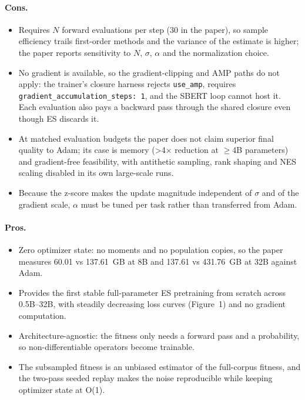\paragraph{Cons.}
\begin{itemize}[leftmargin=*]
\item Requires $N$ forward evaluations per step (30 in the paper), so sample efficiency trails first-order methods and the variance of the estimate is higher; the paper reports sensitivity to $N$, $\sigma$, $\alpha$ and the normalization choice.
\item No gradient is available, so the gradient-clipping and AMP paths do not apply: the trainer's closure harness rejects \texttt{use\_amp}, requires \texttt{gradient\_accumulation\_steps: 1}, and the SBERT loop cannot host it. Each evaluation also pays a backward pass through the shared closure even though ES discards it.
\item At matched evaluation budgets the paper does not claim superior final quality to Adam; its case is memory (>4$\times$ reduction at $\ge$4B parameters) and gradient-free feasibility, with antithetic sampling, rank shaping and NES scaling disabled in its own large-scale runs.
\item Because the z-score makes the update magnitude independent of $\sigma$ and of the gradient scale, $\alpha$ must be tuned per task rather than transferred from Adam.
\end{itemize}

\paragraph{Pros.}
\begin{itemize}[leftmargin=*]
\item Zero optimizer state: no moments and no population copies, so the paper measures 60.01 vs 137.61~GB at 8B and 137.61 vs 431.76~GB at 32B against Adam.
\item Provides the first stable full-parameter ES pretraining from scratch across 0.5B--32B, with steadily decreasing loss curves (Figure~1) and no gradient computation.
\item Architecture-agnostic: the fitness only needs a forward pass and a probability, so non-differentiable operators become trainable.
\item The subsampled fitness is an unbiased estimator of the full-corpus fitness, and the two-pass seeded replay makes the noise reproducible while keeping optimizer state at O(1).
\end{itemize}

